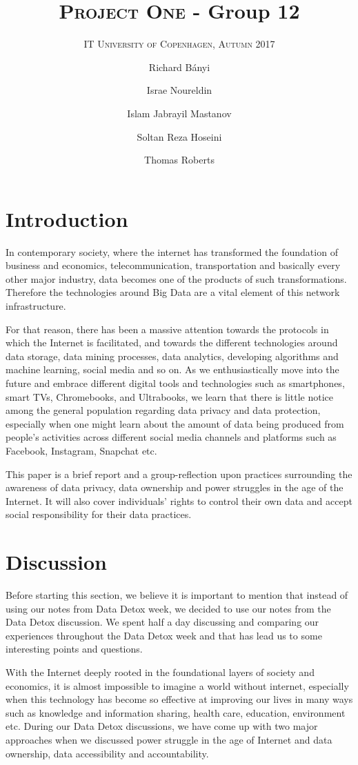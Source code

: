 \documentclass[format=acmsmall, review=false, screen=true]{acmart}
\author{Richard Bányi}
\author{Israe Noureldin}
\author{Islam Jabrayil Mastanov}
\author{Soltan Reza Hoseini}
\author{Thomas Roberts}
\title{\textsc{Project One} - Group 12}
\subtitle{\textsc{IT University of Copenhagen, Autumn 2017}}
\begin{document}
\maketitle 

\section{Introduction}
In contemporary society, where the internet has transformed the foundation of business and economics, telecommunication, transportation and basically every other major industry, data becomes one of the products of such transformations. Therefore the technologies around Big Data are a vital element of this network infrastructure.

For that reason, there has been a massive attention towards the protocols in which the Internet is facilitated, and towards the different technologies around data storage, data mining processes, data analytics, developing algorithms and machine learning, social media and so on. As we enthusiastically move into the future and embrace different digital tools and technologies such as smartphones, smart TVs, Chromebooks, and Ultrabooks, we learn that there is little notice among the general population regarding data privacy and data protection, especially when one might learn about the amount of data being produced from people’s activities across different social media channels and platforms such as Facebook, Instagram, Snapchat etc.

This paper is a brief report and a group-reflection upon practices surrounding the awareness of data privacy, data ownership and power struggles in the age of the Internet. It will also cover individuals’ rights to control their own data and accept social responsibility for their data practices.


\section{Discussion}
Before starting this section, we believe it is important to mention that instead of using our notes from Data Detox week, we decided to use our notes from the Data Detox discussion. We spent half a day discussing and comparing our experiences throughout the Data Detox week and that has lead us to some interesting points and questions.
 
With the Internet deeply rooted in the foundational layers of society and economics, it is almost impossible to imagine a world without internet, especially when this technology has become so effective at improving our lives in many ways such as knowledge and information sharing, health care, education, environment etc.
During our Data Detox discussions, we have come up with two major approaches when we discussed power struggle in the age of Internet and data ownership, data accessibility and accountability.
 
\end{document}
